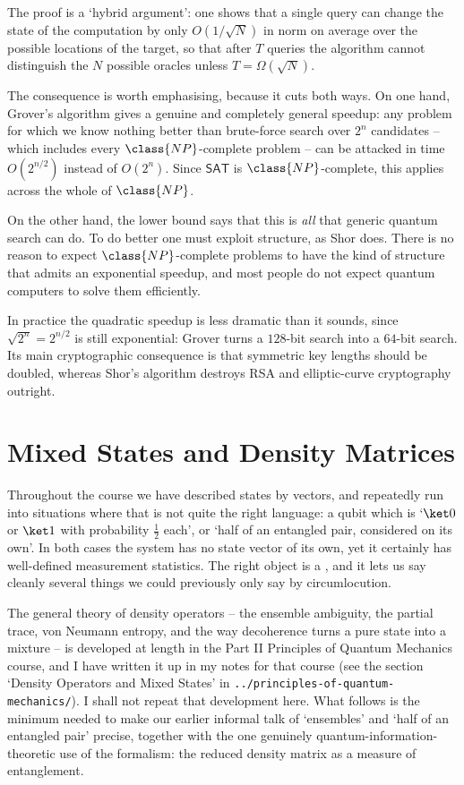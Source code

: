 The proof is a `hybrid argument': one shows that a single query can change the state of the computation by only $O(1/\sqrt N)$ in norm on average over the possible locations of the target, so that after $T$ queries the algorithm cannot distinguish the $N$ possible oracles unless $T = \Omega(\sqrt N)$.

The consequence is worth emphasising, because it cuts both ways. On one hand, Grover's algorithm gives a genuine and completely general speedup: any problem for which we know nothing better than brute-force search over $2^n$ candidates -- which includes every $\class{NP}$-complete problem -- can be attacked in time $O(2^{n/2})$ instead of $O(2^n)$. Since $\mathsf{SAT}$ is $\class{NP}$-complete, this applies across the whole of $\class{NP}$.

On the other hand, the lower bound says that this is \emph{all} that generic quantum search can do. To do better one must exploit structure, as Shor does. There is no reason to expect $\class{NP}$-complete problems to have the kind of structure that admits an exponential speedup, and most people do not expect quantum computers to solve them efficiently.

\begin{remark}
	In practice the quadratic speedup is less dramatic than it sounds, since $\sqrt{2^n} = 2^{n/2}$ is still exponential: Grover turns a $128$-bit search into a $64$-bit search. Its main cryptographic consequence is that symmetric key lengths should be doubled, whereas Shor's algorithm destroys RSA and elliptic-curve cryptography outright.
\end{remark}

\section{Mixed States and Density Matrices}

Throughout the course we have described states by vectors, and repeatedly run into situations where that is not quite the right language: a qubit which is `$\ket0$ or $\ket1$ with probability $\tfrac12$ each', or `half of an entangled pair, considered on its own'. In both cases the system has no state vector of its own, yet it certainly has well-defined measurement statistics. The right object is a , and it lets us say cleanly several things we could previously only say by circumlocution.

The general theory of density operators -- the ensemble ambiguity, the partial trace, von Neumann entropy, and the way decoherence turns a pure state into a mixture -- is developed at length in the Part II Principles of Quantum Mechanics course, and I have written it up in my notes for that course (see the section `Density Operators and Mixed States' in \texttt{../principles-of-quantum-mechanics/}). I shall not repeat that development here. What follows is the minimum needed to make our earlier informal talk of `ensembles' and `half of an entangled pair' precise, together with the one genuinely quantum-information-theoretic use of the formalism: the reduced density matrix as a measure of entanglement.

